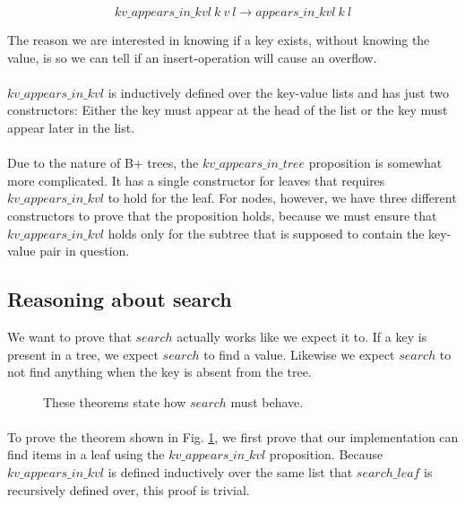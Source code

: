 \begin{equation}
  kv\_appears\_in\_kvl~k~v~l \rightarrow appears\_in\_kvl~k~l
  \label{eq:kv_appear_impl_appear}
\end{equation}

The reason we are interested in knowing if a key exists, without knowing the value, is so we can tell if an insert-operation will cause an overflow.

\paragraph{}
$kv\_appears\_in\_kvl$ is inductively defined over the key-value lists and has just two constructors: Either the key must appear at the head of the list or the key must appear later in the list.

\paragraph{}
Due to the nature of B+ trees, the $kv\_appears\_in\_tree$ proposition is somewhat more complicated. It has a single constructor for leaves that requires $kv\_appears\_in\_kvl$ to hold for the leaf. For nodes, however, we have three different constructors to prove that the proposition holds, because we must ensure that $kv\_appears\_in\_kvl$ holds only for the subtree that is supposed to contain the key-value pair in question.

\subsection{Reasoning about search}
We want to prove that $search$ actually works like we expect it to. If a key is present in a tree, we expect $search$ to find a value. Likewise we expect $search$ to not find anything when the key is absent from the tree.

\begin{figure}
  
  \caption{These theorems state how $search$ must behave.}
  \label{fig:search_works}
\end{figure}

\paragraph{}
To prove the theorem shown in Fig. \ref{fig:search_works}, we first prove that our implementation can find items in a leaf using the $kv\_appears\_in\_kvl$ proposition. Because $kv\_appears\_in\_kvl$ is defined inductively over the same list that $search\_leaf$ is recursively defined over, this proof is trivial.

